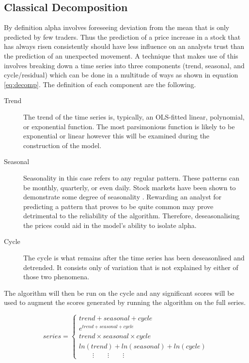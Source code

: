 \subsection{Classical Decomposition}
By definition alpha involves foreseeing deviation from the mean that is only predicted by few traders. Thus the prediction of a price increase in a stock that has always risen consistently should have less influence on an analysts trust than the prediction of an unexpected movement. A technique that makes use of this involves breaking down a time series into three components (trend, seasonal, and cycle/residual) which can be done in a multitude of ways as shown in equation \ref{eq:decomp}. The definition of each component are the following.
\begin{description}
    \item[Trend] The trend of the time series is, typically, an OLS-fitted linear, polynomial, or exponential function. The most parsimonious function is likely to be exponential or linear however this will be examined during the construction of the model.
    \item[Seasonal] Seasonality in this case refers to any regular pattern. These patterns can be monthly, quarterly, or even daily. Stock markets have been shown to demonstrate some degree of seasonality \cite{bogousslavsky2016infrequent}. Rewarding an analyst for predicting a pattern that proves to be quite common may prove detrimental to the reliability of the algorithm. Therefore, deseasonalising the prices could aid in the model's ability to isolate alpha.
    \item[Cycle] The cycle is what remains after the time series has been deseasonlised and detrended. It consists only of variation that is not explained by either of those two phenomena.
\end{description}
The algorithm will then be run on the cycle and any significant scores will be used to augment the scores generated by running the algorithm on the full series.



\begin{equation}
    \textit{series} = \begin{cases}
    \textit{trend} + \textit{seasonal} + \textit{cycle} \\
    e^{\textit{trend} + \textit{seasonal} + \textit{cycle}} \\
    \textit{trend}\times \textit{seasonal}\times \textit{cycle} \\
    ln(\textit{trend}) + ln(\textit{seasonal}) + ln(\textit{cycle})\\
    \qquad\vdots\qquad\vdots\qquad\vdots
    \end{cases} \label{eq:decomp}
\end{equation}

